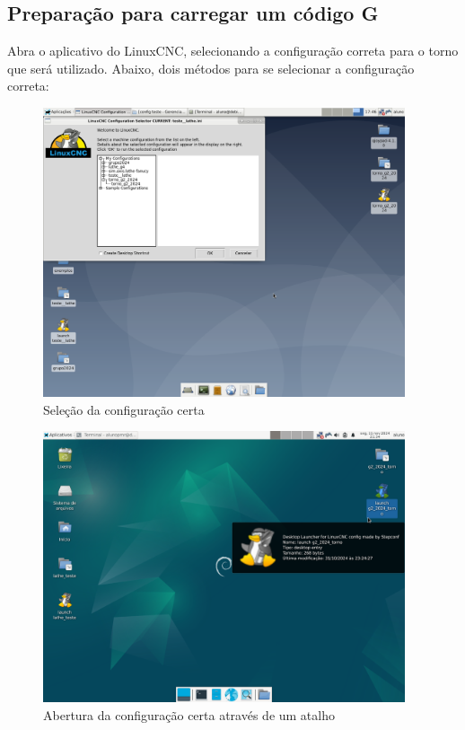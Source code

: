 \documentclass[twoside,a4paper]{refart}
\begin{document}
\subsection{Preparação para carregar um código G}
Abra o aplicativo do LinuxCNC, selecionando a configuração correta para o torno que será utilizado. Abaixo, dois métodos para se selecionar a configuração correta:

\begin{figure}[H]
    \begin{center}
        \includegraphics[width=0.95\textwidth]{imagens/Abertura_do_linux_CNC.png}
    \end{center}
    \caption{Seleção da configuração certa}\label{abrircncpiorjeito}
\end{figure}

\begin{figure}[H]
    \begin{center}
        \includegraphics[width=0.95\textwidth]{imagens/atalho.png}
    \end{center}
    \caption{Abertura da configuração certa através de um atalho}\label{abrirmelhorjeito}
\end{figure}
\end{document}
